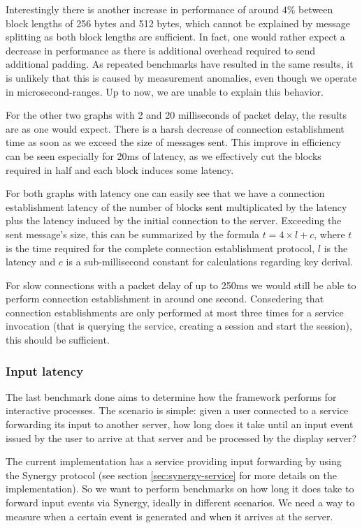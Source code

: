 Interestingly there is another increase in performance of around $4\%$ between block lengths of 256 bytes and 512 bytes, which cannot be explained by message splitting as both block lengths are sufficient.
In fact, one would rather expect a decrease in performance as there is additional overhead required to send additional padding.
As repeated benchmarks have resulted in the same results, it is unlikely that this is caused by measurement anomalies, even though we operate in microsecond-ranges.
Up to now, we are unable to explain this behavior.

For the other two graphs with 2 and 20 milliseconds of packet delay, the results are as one would expect.
There is a harsh decrease of connection establishment time as soon as we exceed the size of messages sent.
This improve in efficiency can be seen especially for 20ms of latency, as we effectively cut the blocks required in half and each block induces some latency.

For both graphs with latency one can easily see that we have a connection establishment latency of the number of blocks sent multiplicated by the latency plus the latency induced by the initial connection to the server.
Exceeding the sent message's size, this can be summarized by the formula $t = 4 \times l + c$, where $t$ is the time required for the complete connection establishment protocol, $l$ is the latency and $c$ is a sub-millisecond constant for calculations regarding key derival.

For slow connections with a packet delay of up to 250ms we would still be able to perform connection establishment in around one second.
Consedering that connection establishments are only performed at most three times for a service invocation (that is querying the service, creating a session and start the session), this should be sufficient.

\subsubsection{Input latency}

The last benchmark done aims to determine how the framework performs for interactive processes.
The scenario is simple: given a user connected to a service forwarding its input to another server, how long does it take until an input event issued by the user to arrive at that server and be processed by the display server?

The current implementation has a service providing input forwarding by using the Synergy protocol (see section \ref{sec:synergy-service} for more details on the implementation).
So we want to perform benchmarks on how long it does take to forward input events via Synergy, ideally in different scenarios.
We need a way to measure when a certain event is generated and when it arrives at the server.

